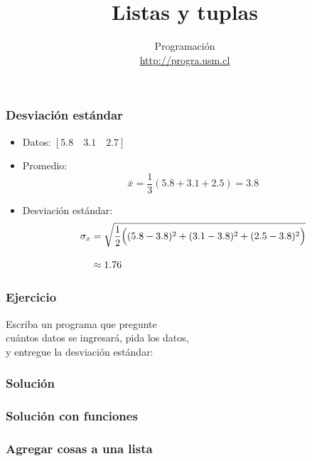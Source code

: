 \documentclass[12pt]{beamer}
\title{Listas y tuplas}
\author{
  Programación \\ \url{http://progra.usm.cl}
}
\date{}
\begin{document}
  \begin{frame}
    \maketitle
  \end{frame}

  \begin{frame}
    \frametitle{Desviación estándar}
    \label{def-desviacion}
    \begin{itemize}
      \item Datos: \([5.8\quad 3.1\quad 2.7]\)
      \item Promedio:
        \[
          \bar{x} =
          \frac{1}{3}
          (5.8 + 3.1 + 2.5) = 3.8
        \]
      \item Desviación estándar:
        \begin{align*}
          \sigma_x &=
          \sqrt{
            \frac{1}{2}
            \Bigl(
              (5.8 - 3.8)^2 +
              (3.1 - 3.8)^2 +
              (2.5 - 3.8)^2
            \Bigr)
          } \\[2ex]
          &\approx 1.76
        \end{align*}
    \end{itemize}

  \end{frame}

  \begin{frame}
    \label{ejercicio-desviacion}
    \frametitle{Ejercicio}
    Escriba un programa que pregunte \\
    cuántos datos se ingresará, pida los datos, \\
    y entregue la desviación estándar:
    
  \end{frame}

  \begin{frame}
    \label{programa-desviacion}
    \frametitle{Solución}
    \footnotesize
    
  \end{frame}

  \begin{frame}
    \label{programa-desviacion-funciones}
    \frametitle{Solución con funciones}
    \tiny
    
  \end{frame}

  \begin{frame}
    \label{listas-agregar}
    \frametitle{Agregar cosas a una lista}
    
  \end{frame}
\end{document}

